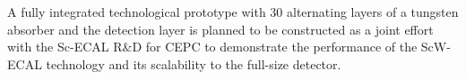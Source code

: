 A fully integrated technological prototype with 30 alternating 
layers of a tungsten absorber and the detection layer 
is planned to be constructed 
as a joint effort with the Sc-ECAL R\&D for CEPC 
to demonstrate the performance of the ScW-ECAL technology 
and its scalability to the full-size detector. 

\vspace{2cm}

